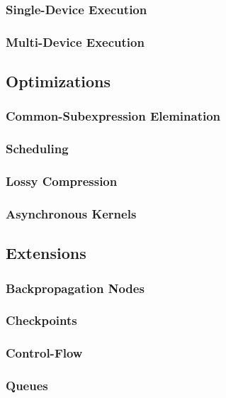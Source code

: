 \subsubsection{Single-Device Execution}\label{sec:model-exec-single}

\subsubsection{Multi-Device Execution}\label{sec:model-exec-many}

\subsection{Optimizations}\label{sec:model-optim}

\subsubsection{Common-Subexpression Elemination}\label{sec:model-optim-common}

\subsubsection{Scheduling}\label{sec:model-optim-schedule}

\subsubsection{Lossy Compression}\label{sec:model-optim-lossy}

\subsubsection{Asynchronous Kernels}\label{sec:model-optim-async}

\subsection{Extensions}\label{sec:model-ext}

\subsubsection{Backpropagation Nodes}\label{sec:model-ext-backprop}

\subsubsection{Checkpoints}\label{sec:model-ext-check}

\subsubsection{Control-Flow}\label{sec:model-ext-flow}

\subsubsection{Queues}\label{sec:model-ext-queues}

